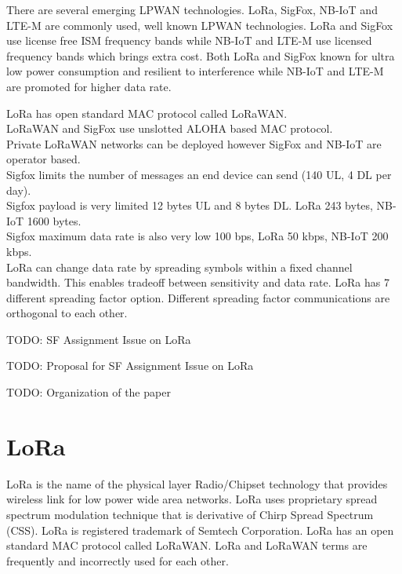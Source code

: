\documentclass[conference]{IEEEtran}
\begin{document}
\par There are several emerging LPWAN technologies. LoRa, SigFox, NB-IoT and LTE-M are commonly used, well known LPWAN technologies. LoRa and SigFox use license free ISM frequency bands while NB-IoT and LTE-M use licensed frequency bands which brings extra cost. Both LoRa and SigFox known for ultra low power consumption and resilient to interference while NB-IoT and LTE-M are promoted for higher data rate. 

LoRa has open standard MAC protocol called LoRaWAN.\\
LoRaWAN and SigFox use unslotted ALOHA based MAC protocol.\\
Private LoRaWAN networks can be deployed however SigFox and NB-IoT are operator based.\\
Sigfox limits the number of messages an end device can send (140 UL, 4 DL per day).\\
Sigfox payload is very limited 12 bytes UL and 8 bytes DL. LoRa 243 bytes, NB-IoT 1600 bytes.\\
Sigfox maximum data rate is also very low 100 bps, LoRa 50 kbps, NB-IoT 200 kbps.\\
LoRa can change data rate by spreading symbols within a fixed channel bandwidth. This enables tradeoff between sensitivity and data rate. LoRa has 7 different spreading factor option. Different spreading factor communications are orthogonal to each other.

\par TODO: SF Assignment Issue on LoRa

\par TODO: Proposal for SF Assignment Issue on LoRa

\par TODO: Organization of the paper


\section{LoRa}
\par LoRa is the name of the physical layer Radio/Chipset technology that provides wireless link for low power wide area networks. LoRa uses proprietary spread spectrum modulation technique that is derivative of Chirp Spread Spectrum (CSS). LoRa is registered trademark of Semtech Corporation. LoRa has an open standard MAC protocol called LoRaWAN. LoRa and LoRaWAN terms are frequently and incorrectly used for each other.
\end{document}
